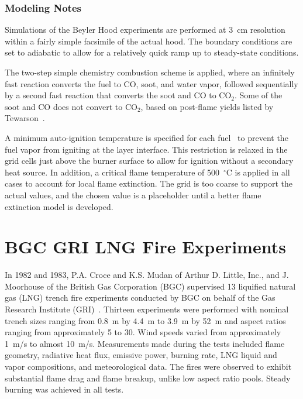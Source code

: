 \subsubsection{Modeling Notes}

Simulations of the Beyler Hood experiments are performed at 3~cm resolution within a fairly simple facsimile of the actual hood. The boundary conditions are set to adiabatic to allow for a relatively quick ramp up to steady-state conditions.

The two-step simple chemistry combustion scheme is applied, where an infinitely fast reaction converts the fuel to CO, soot, and water vapor, followed sequentially by a second fast reaction that converts the soot and CO to CO$_2$. Some of the soot and CO does not convert to CO$_2$, based on post-flame yields listed by Tewarson~\cite{SFPE:Tewarson}.

A minimum auto-ignition temperature is specified for each fuel~\cite{SFPE:Beyler} to prevent the fuel vapor from igniting at the layer interface. This restriction is relaxed in the grid cells just above the burner surface to allow for ignition without a secondary heat source. In addition, a critical flame temperature of 500~$^\circ$C is applied in all cases to account for local flame extinction. The grid is too coarse to support the actual values, and the chosen value is a placeholder until a better flame extinction model is developed.

\section{BGC GRI LNG Fire Experiments}
\label{BGC_GRI_LNG_Fires_Description}

In 1982 and 1983, P.A. Croce and K.S. Mudan of Arthur D. Little, Inc., and J. Moorhouse of the British Gas Corporation (BGC) supervised 13 liquified natural gas (LNG) trench fire experiments conducted by BGC on behalf of the Gas Research Institute (GRI)~\cite{Croce:GRI}. Thirteen experiments were performed with nominal trench sizes ranging from 0.8~m by 4.4~m to 3.9~m by 52~m and aspect ratios ranging from approximately 5 to 30. Wind speeds varied from approximately 1~m/s to almost 10~m/s. Measurements made during the tests included flame geometry, radiative heat flux, emissive power, burning rate, LNG liquid and vapor compositions, and meteorological data. The fires were observed to exhibit substantial flame drag and flame breakup, unlike low aspect ratio pools. Steady burning was achieved in all tests.


